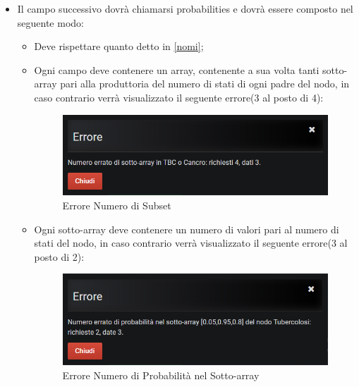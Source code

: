 \begin{itemize}
\begin{itemize}
	\end{itemize}
	
	\item Il campo successivo dovrà chiamarsi probabilities e dovrà essere composto nel seguente modo:
	
	\begin{itemize}
		\item Deve rispettare quanto detto  in \ref{nomi};
		\item Ogni campo deve contenere un array, contenente a sua volta tanti sotto-array pari alla produttoria del numero di stati di ogni padre del nodo, in caso contrario verrà visualizzato il seguente errore(3 al posto di 4):
		
		\begin{figure}[H]
	\begin{center}
		\includegraphics[scale=0.8]{./images/wrongSubsets.png}
		 \caption{Errore Numero di Subset}	
		 \label{erWrongSubsets}
	\end{center}
	\end{figure}	
		
		\item Ogni sotto-array deve contenere un numero di valori pari al numero di stati del nodo, in caso contrario verrà visualizzato il seguente errore(3 al posto di 2): 
		
		\begin{figure}[H]
	\begin{center}
		\includegraphics[scale=0.8]{./images/numberProbs.png}
		 \caption{Errore Numero di Probabilità nel Sotto-array}	
		 \label{erWrongSubsets}
	\end{center}
	\end{figure}	
	

\end{itemize}
\end{itemize}
